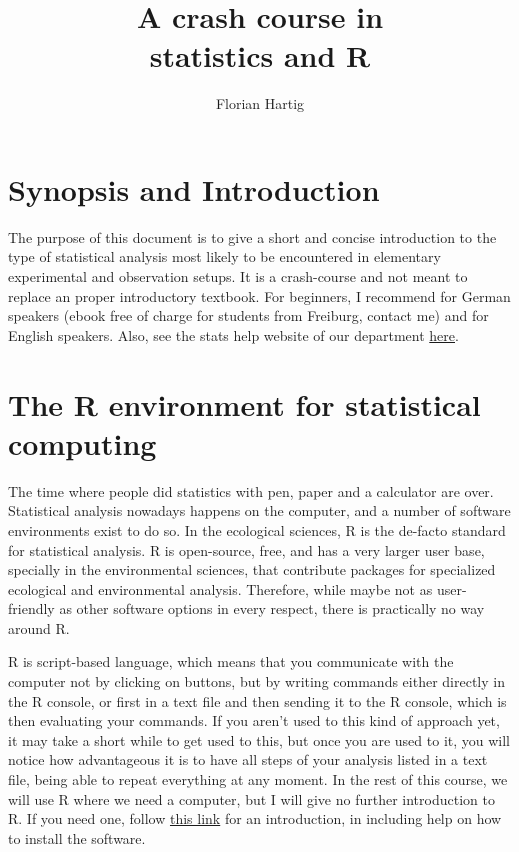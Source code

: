 \documentclass[a4paper,twoside]{tufte-book} %
\title{A crash course in\\statistics and R}
\author{Florian Hartig}
\begin{document}
\let\cleardoublepage\clearpage %
\maketitle
\newpage
\tableofcontents

\chapter{Synopsis and Introduction} %

The purpose of this document is to give a short and concise introduction to the type of statistical analysis most likely to be encountered in elementary experimental and observation setups. It is a crash-course and not meant to replace an proper introductory textbook. For beginners, I recommend \citep{Dormann-ParametrischeStatistik-2013} for German speakers (ebook free of charge for students from Freiburg, contact me) and \citep{Gotelli-PrimerEcologicalStatistics-2004} for English speakers. Also, see the stats help website of our department \href{http://biometry.github.io/APES/}{here}.
 
\chapter{The R environment for statistical computing}

The time where people did statistics with pen, paper and a calculator are over. Statistical analysis nowadays happens on the computer, and a number of software environments exist to do so. In the ecological sciences, R is the de-facto standard for statistical analysis. R is open-source, free, and has a very larger user base, specially in the environmental sciences, that contribute packages for specialized ecological and environmental analysis. Therefore, while maybe not as user-friendly as other software options in every respect, there is practically no way around R.

R is script-based language, which means that you communicate with the computer not by clicking on buttons, but by writing commands either directly in the R console, or first in a text file and then sending it to the R console, which is then evaluating your commands. If you aren't used to this kind of approach yet, it may take a short while to get used to this, but once you are used to it, you will notice how advantageous it is to have all steps of your analysis listed in a text file, being able to repeat everything at any moment. In the rest of this course, we will use R where we need a computer, but I will give no further introduction to R. If you need one, follow  \href{http://biometry.github.io/APES/R/R10-gettingStarted.html}{this link} for an introduction, in including help on how to install the software.
\end{document}
